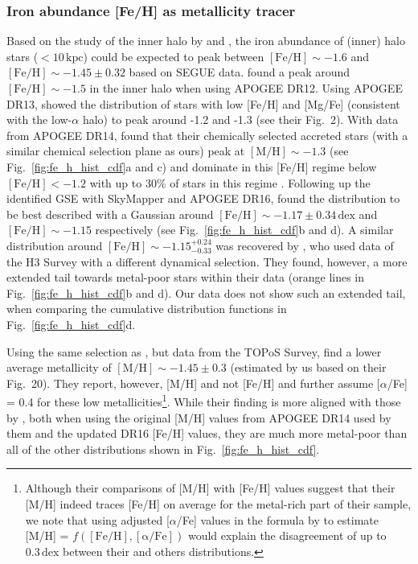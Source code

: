 \documentclass[fleqn,usenatbib]{mnras}
\newcommand{\dex}{\,\mathrm{dex}}	%
\newcommand{\kpc}{\,\mathrm{kpc}}	%
\begin{document}
\subsubsection{Iron abundance [Fe/H] as metallicity tracer} \label{sec:gse_stellar_chemistry_fe_h}

Based on the study of the inner halo by \citet{Carollo2007} and \citet{Ivezic2008}, the iron abundance of (inner) halo stars ($<10\kpc$) could be expected to peak between $\mathrm{[Fe/H]} \sim -1.6$ and $\mathrm{[Fe/H]} \sim -1.45\pm0.32$ based on SEGUE data. \citet{FernandezAlvar2017} found a peak around $\mathrm{[Fe/H]} \sim -1.5$ in the inner halo when using APOGEE DR12. Using APOGEE DR13, \citet{Hayes2018} showed the distribution of stars with low [Fe/H] and [Mg/Fe] (consistent with the low-$\alpha$ halo) to peak around -1.2 and -1.3 (see their Fig.~2). With data from APOGEE DR14, \citet{Das2020} found that their chemically selected accreted stars (with a similar chemical selection plane as ours) peak at $\mathrm{[M/H]} \sim -1.3$ (see Fig.~\ref{fig:fe_h_hist_cdf}a and c) and dominate in this [Fe/H] regime below $\mathrm{[Fe/H]} < -1.2$ with up to 30\% of stars in this regime \citep[see also][]{Mackereth2019}. Following up the identified GSE with SkyMapper and APOGEE DR16, \citet{Feuillet2020, Feuillet2021} found the distribution to be best described with a Gaussian around $\mathrm{[Fe/H]} \sim -1.17 \pm 0.34\dex$ and $\mathrm{[Fe/H]} \sim -1.15$ respectively (see Fig.~\ref{fig:fe_h_hist_cdf}b and d). A similar distribution around $\mathrm{[Fe/H]} \sim -1.15_{-0.33}^{+0.24}$ was recovered by \citet{Naidu2020}, who used data of the H3 Survey with a different dynamical selection. They found, however, a more extended tail towards metal-poor stars within their data (orange lines in Fig.~\ref{fig:fe_h_hist_cdf}b and d). Our data does not show such an extended tail, when comparing the cumulative distribution functions in Fig.~\ref{fig:fe_h_hist_cdf}d.

Using the same selection as \citet{Feuillet2020}, but data from the TOPoS Survey, \citet{Bonifacio2021} find a lower average metallicity of $\mathrm{[M/H]} \sim -1.45 \pm 0.3$ (estimated by us based on their Fig.~20). They report, however, [M/H] and not [Fe/H] and further assume [$\alpha$/Fe] = 0.4 for these low metallicities\footnote{Although their comparisons of [M/H] with [Fe/H] values suggest that their [M/H] indeed traces [Fe/H] on average for the metal-rich part of their sample, we note that using adjusted [$\alpha$/Fe] values in the formula by \citet{Salaris2006} to estimate [M/H] = $f(\mathrm{[Fe/H]}, \mathrm{[\alpha/Fe]})$ would explain the disagreement of up to $0.3 \dex$ between their and others distributions.}. While their finding is more aligned with those by \citet{Das2020}, both when using the original [M/H] values from APOGEE DR14 used by them and the updated DR16 [Fe/H] values, they are much more metal-poor than all of the other distributions shown in Fig.~\ref{fig:fe_h_hist_cdf}.
\end{document}
